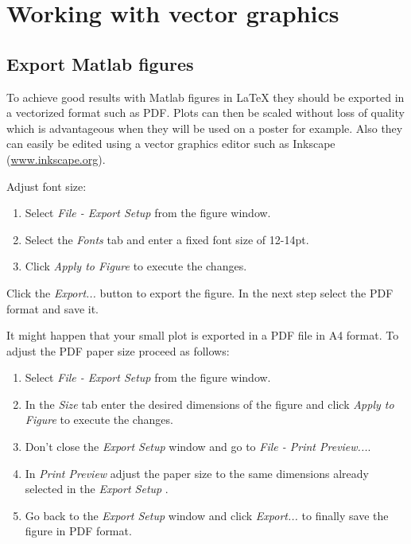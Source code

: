 

\chapter{Working with vector graphics }\label{c:vectorgraphics}

\section{Export Matlab figures}\label{s:matlabfigures}
To achieve good results with Matlab figures in \LaTeX{} they should be exported in a vectorized format such as PDF. Plots can then be scaled without loss of quality which is advantageous when they will be used on a poster for example. Also they can easily be edited using a vector graphics editor such as Inkscape (\url{www.inkscape.org}).

\vspace{5mm}
Adjust font size:
\begin{enumerate}
\item Select \textit{File - Export Setup} from the figure window.
\item Select the \textit{Fonts} tab and enter a fixed font size of 12-14pt.
\item Click \textit{Apply to Figure} to execute the changes.
\end{enumerate}


Click the \textit{Export...} button to export the figure. In the next step select the PDF format and save it.
\vspace{5mm}

It might happen that your small plot is exported in a PDF file in A4 format. 
To adjust the PDF paper size proceed as follows:
\begin{enumerate}
\item Select \textit{File - Export Setup} from the figure window.
\item In the \textit{Size} tab enter the desired dimensions of the figure and click \textit{Apply to Figure} to execute the changes.
\item Don't close the \textit{Export Setup} window and go to \textit{File - Print Preview...}.
\item In \textit{Print Preview } adjust the paper size to the same dimensions already selected in the \textit{Export Setup} .
\item Go back to the \textit{Export Setup} window and click \textit{Export...} to finally save the figure in PDF format. 
\end{enumerate}



